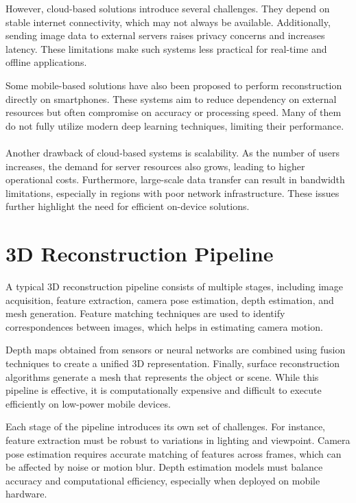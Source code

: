 However, cloud-based solutions introduce several challenges. They depend on stable internet connectivity, which may not always be available. Additionally, sending image data to external servers raises privacy concerns and increases latency. These limitations make such systems less practical for real-time and offline applications.

Some mobile-based solutions have also been proposed to perform reconstruction directly on smartphones. These systems aim to reduce dependency on external resources but often compromise on accuracy or processing speed. Many of them do not fully utilize modern deep learning techniques, limiting their performance. \\ \\

Another drawback of cloud-based systems is scalability. As the number of users increases, the demand for server resources also grows, leading to higher operational costs. Furthermore, large-scale data transfer can result in bandwidth limitations, especially in regions with poor network infrastructure. These issues further highlight the need for efficient on-device solutions.

\section{3D Reconstruction Pipeline}

A typical 3D reconstruction pipeline consists of multiple stages, including image acquisition, feature extraction, camera pose estimation, depth estimation, and mesh generation. Feature matching techniques are used to identify correspondences between images, which helps in estimating camera motion.

Depth maps obtained from sensors or neural networks are combined using fusion techniques to create a unified 3D representation. Finally, surface reconstruction algorithms generate a mesh that represents the object or scene. While this pipeline is effective, it is computationally expensive and difficult to execute efficiently on low-power mobile devices.

Each stage of the pipeline introduces its own set of challenges. For instance, feature extraction must be robust to variations in lighting and viewpoint. Camera pose estimation requires accurate matching of features across frames, which can be affected by noise or motion blur. Depth estimation models must balance accuracy and computational efficiency, especially when deployed on mobile hardware.

